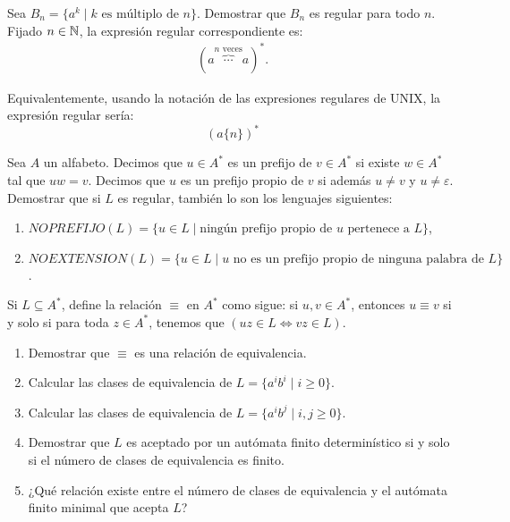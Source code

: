 \begin{ejercicio}
    Sea $B_n = \{a^k \mid k \text{ es múltiplo de } n\}$. Demostrar que $B_n$ es regular para todo $n$.\\

    Fijado $n\in \mathbb{N}$, la expresión regular correspondiente es:
    \begin{align*}
        (a\overbrace{\cdots }^{n \text{ veces}}a)^*.
    \end{align*}

    Equivalentemente, usando la notación de las expresiones regulares de UNIX, la expresión regular sería:
    \begin{equation*}
        (a\{n\})^*
    \end{equation*}

\end{ejercicio}

\begin{ejercicio}
    Sea $A$ un alfabeto. Decimos que $u\in A^*$ es un prefijo de $v\in A^*$ si existe $w\in A^*$ tal que $uw = v$. Decimos que $u$ es un prefijo propio de $v$ si además $u \neq v$ y $u \neq \varepsilon$. Demostrar que si $L$ es regular, también lo son los lenguajes siguientes:
    \begin{enumerate}
        \item $NOPREFIJO(L) = \{u \in L \mid \text{ningún prefijo propio de } u \text{ pertenece a } L\}$,
        \item $NOEXTENSION(L) = \{u \in L \mid u \text{ no es un prefijo propio de ninguna palabra de } L\}$.
    \end{enumerate}
\end{ejercicio}

\begin{ejercicio}
    Si $L \subseteq A^*$, define la relación $\equiv$ en $A^*$ como sigue: si $u, v \in A^*$, entonces $u \equiv v$ si y solo si para toda $z \in A^*$, tenemos que $(uz \in L \Leftrightarrow vz \in L)$.
    \begin{enumerate}
        \item Demostrar que $\equiv$ es una relación de equivalencia.
        \item Calcular las clases de equivalencia de $L = \{a^ib^i \mid i \geq 0\}$.
        \item Calcular las clases de equivalencia de $L = \{a^ib^j \mid i, j \geq 0\}$.
        \item Demostrar que $L$ es aceptado por un autómata finito determinístico si y solo si el número de clases de equivalencia es finito.
        \item ¿Qué relación existe entre el número de clases de equivalencia y el autómata finito minimal que acepta $L$?
    \end{enumerate}
\end{ejercicio}

